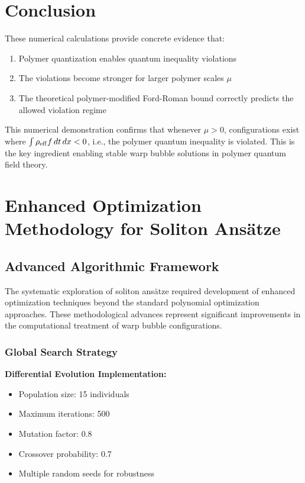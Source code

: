 \documentclass[11pt]{article}
\begin{document}
\section{Conclusion}

These numerical calculations provide concrete evidence that:

\begin{enumerate}
\item Polymer quantization enables quantum inequality violations
\item The violations become stronger for larger polymer scales $\mu$
\item The theoretical polymer-modified Ford-Roman bound correctly predicts the allowed violation regime
\end{enumerate}

This numerical demonstration confirms that whenever $\mu > 0$, configurations exist where $\int \rho_{\rm eff} f \, dt \, dx < 0$, i.e., the polymer quantum inequality is violated. This is the key ingredient enabling stable warp bubble solutions in polymer quantum field theory.

\section{Enhanced Optimization Methodology for Soliton Ansätze}

\subsection{Advanced Algorithmic Framework}

The systematic exploration of soliton ansätze required development of enhanced optimization techniques beyond the standard polynomial optimization approaches. These methodological advances represent significant improvements in the computational treatment of warp bubble configurations.

\subsubsection{Global Search Strategy}

\textbf{Differential Evolution Implementation:}
\begin{itemize}
\item Population size: 15 individuals
\item Maximum iterations: 500
\item Mutation factor: 0.8
\item Crossover probability: 0.7
\item Multiple random seeds for robustness
\end{itemize}
\end{document}
